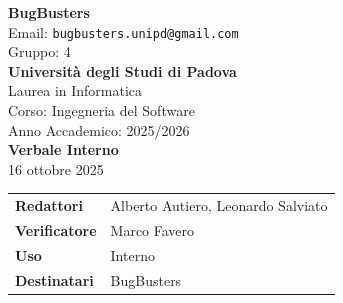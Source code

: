 \documentclass[a4paper,12pt]{article}
\begin{document}
\begin{center}  
  
  {\Large\bfseries\color{primaryblue} BugBusters}\\[0.3cm]
  {\small\color{darkgray} Email: \texttt{bugbusters.unipd@gmail.com}} \\[0.1cm]
  {\small\color{darkgray} Gruppo: 4} \\[0.5cm]

  {\large\bfseries Università degli Studi di Padova}\\[0.3cm]
  {\small Laurea in Informatica}\\[0.2cm]
  {\small Corso: Ingegneria del Software}\\[0.2cm]
  {\small Anno Accademico: 2025/2026}\\[0.8cm]

  {\Huge\bfseries\color{primaryblue} Verbale Interno}\\[0.3cm]
  {\Large\color{secondaryblue} 16 ottobre 2025}\\[0.8cm]
\end{center}

\begin{center}
\begin{tcolorbox}[colback=lightgray,colframe=primaryblue,width=0.85\textwidth,arc=3mm,boxrule=0.5pt]
\begin{tabular}{@{}ll@{}}
\textbf{Redattori}    & Alberto Autiero, Leonardo Salviato \\
\textbf{Verificatore}    & Marco Favero \\
\textbf{Uso}          & Interno \\
\textbf{Destinatari}  & BugBusters \\
\end{tabular}
\end{tcolorbox}
\end{center}
\end{document}
